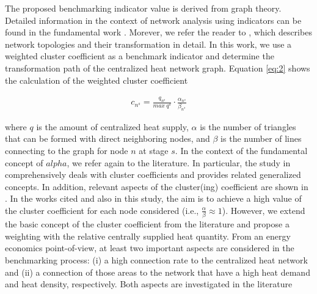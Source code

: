 The proposed benchmarking indicator value is derived from graph theory. Detailed information in the context of network analysis using indicators can be found in the fundamental work . Morever, we refer the reader to  \cite{sanfeliu1983distance}, which describes network topologies and their transformation in detail. In this work, we use a weighted cluster coefficient as a benchmark indicator and determine the transformation path of the centralized heat network graph. Equation \ref{eq:2} shows the calculation of the weighted cluster coefficient

\begin{align}\label{eq:2}
c_{n^{s}}=\frac{q_{n^{s}}}{max~q^{s}}\cdot \frac{\alpha_{n^{s}}}{\beta_{n^{s}}}
\end{align}

where $q$ is the amount of centralized heat supply, $\alpha$ is the number of triangles that can be formed with direct neighboring nodes, and $\beta$ is the number of lines connecting to the graph for node $n$ at stage $s$. In the context of the fundamental concept of $alpha$, we refer again to the literature. In particular, the study in \cite{huang2010link} comprehensively deals with cluster coefficients and provides related generalized concepts. In addition, relevant aspects of the cluster(ing) coefficient are shown in \cite{cui2014detecting}. In the works cited and also in this study, the aim is to achieve a high value of the cluster coefficient for each node considered (i.e., $\frac{\alpha}{\beta} \approx 1$). However, we extend the basic concept of the cluster coefficient from the literature and propose a weighting with the relative centrally supplied heat quantity. From an energy economics point-of-view, at least two important aspects are considered in the benchmarking process: (i) a high connection rate to the centralized heat network and (ii) a connection of those areas to the network that have a high heat demand and heat density, respectively. Both aspects are investigated in the literature 


